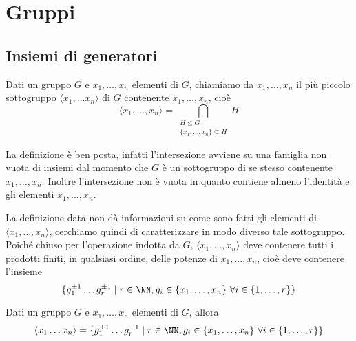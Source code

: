 \documentclass[11pt]{scrartcl}
\begin{document}
\newpage

\section{Gruppi}

\subsection{Insiemi di generatori}

\begin{definition}
    Dati un gruppo $G$ e $x_1, \ldots, x_n$ elementi di $G$, chiamiamo  da $x_1, \ldots, x_n$ il più piccolo sottogruppo $\langle x_1, \ldots x_n
    \rangle$ di $G$ contenente $x_1, \ldots, x_n$, cioè \[\langle x_1, \ldots, x_n\rangle =
    \bigcap_{\substack{H\leqslant G\\ \{x_1, \ldots, x_n\} \subseteq H}} H\] 
\end{definition}

\begin{remark}
    La definizione è ben posta, infatti l'intersezione avviene su una 
    famiglia non vuota di insiemi dal momento che $G$ è un sottogruppo di 
    se stesso contenente $x_1, \ldots, x_n$. Inoltre l'intersezione non è vuota in 
    quanto contiene almeno l'identità e gli elementi $x_1, \ldots, x_n$.
\end{remark}

La definizione data non dà informazioni su come sono fatti gli elementi di 
$\langle x_1, \ldots, x_n\rangle$, cerchiamo quindi di caratterizzare in modo
diverso tale sottogruppo. Poiché chiuso per l'operazione indotta da $G$, $\langle x_1, \ldots, x_n\rangle$
deve contenere tutti i prodotti finiti, in qualsiasi ordine, delle potenze di
$x_1, \ldots, x_n$, cioè deve contenere l'insieme 
\[\{g_1^{\pm 1} \ldots g_r^{\pm 1}\mid r \in \NN, g_i \in \{x_1, \ldots, x_n\}
~\forall i \in \{1, \ldots, r\}\}\]

\begin{proposition}
Dati un gruppo $G$ e $x_1, \ldots, x_n$ elementi di $G$, allora \[
    \langle x_1 \ldots x_n\rangle = \{g_1^{\pm 1} \ldots g_r^{\pm 1}\mid r 
    \in \NN, g_i \in \{x_1, \ldots, x_n\}~\forall i \in \{1, \ldots, r\}\}
    \]
\end{proposition}
\end{document}
